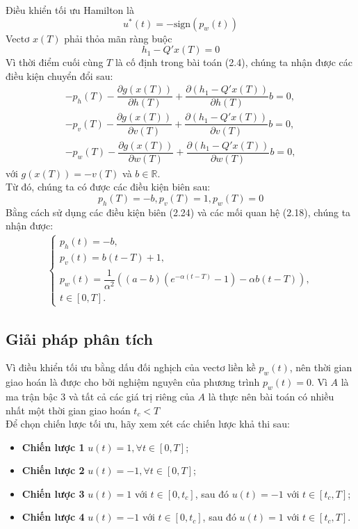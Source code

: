 \documentclass[12pt,a4paper]{report}
\begin{document}
Điều khiển tối ưu Hamilton là \begin{equation}
	u^*(t) = -\text{sign}(p_w(t))
\end{equation}
Vectơ $x(T)$ phải thỏa mãn ràng buộc
$$h_1-Q'x(T)=0$$ Vì thời điểm cuối cùng $T$ là cố định trong bài toán (2.4), chúng ta nhận được các điều kiện chuyển đổi sau:
\begin{eqnarray}
	-p_h(T) - \dfrac{\partial g(x(T))}{\partial h(T)} + \dfrac{\partial(h_1 - Q'x(T))}{\partial h(T)}b = 0, \\
	-p_v(T) - \dfrac{\partial g(x(T))}{\partial v(T)} + \dfrac{\partial(h_1 - Q'x(T))}{\partial v(T)}b = 0, \\ -p_w(T) - \dfrac{\partial g(x(T))}{\partial w(T)} + \dfrac{\partial(h_1 - Q'x(T))}{\partial w(T)}b = 0,
\end{eqnarray} với $g(x(T)) = -v(T)$ và $b \in \mathbb{R}$. \\Từ đó, chúng ta có được các điều kiện biên sau: \begin{equation}
p_h(T) = -b, p_v(T) = 1, p_w(T) = 0
\end{equation}
Bằng cách sử dụng các điều kiện biên (2.24) và các mối quan hệ (2.18), chúng ta nhận được:
\begin{eqnarray}
	\begin{cases}
		p_h(t) = -b, \\ p_v(t) = b(t-T) + 1,  \\ p_w(t) = \dfrac{1}{\alpha^2}((a-b)(e^{-\alpha(t-T)} - 1) - \alpha b(t-T)),  \\ t\in[0, T].
	\end{cases}
\end{eqnarray}
	\subsection{Giải pháp phân tích}
	Vì điều khiển tối ưu bằng dấu đối nghịch của vectơ liền kề $p_w(t)$, nên thời gian giao hoán là
	được cho bởi nghiệm nguyên của phương trình $p_w(t) = 0$. Vì $A$ là ma trận bậc 3 và tất cả các giá trị riêng của $A$ là thực nên bài toán có nhiều nhất một thời gian giao hoán $t_c < T$ \\Để chọn chiến lược tối ưu, hãy xem xét các chiến lược khả thi sau:
	\begin{itemize}
		\item \textbf{Chiến lược 1} $u(t) = 1, \forall t \in [0, T]$; 
		\item \textbf{Chiến lược 2} $u(t) = -1, \forall t \in [0, T]$; \item
		\textbf{Chiến lược 3} $u(t) = 1$ với $t \in [0, t_c]$, sau đó $u(t) = -1$ với $t \in [t_c, T]$;
		\item \textbf{Chiến lược 4} $u(t) = -1$ với $t \in [0, t_c]$, sau đó $u(t) = 1$ với $t \in [t_c, T].$
	\end{itemize}
\end{document}
